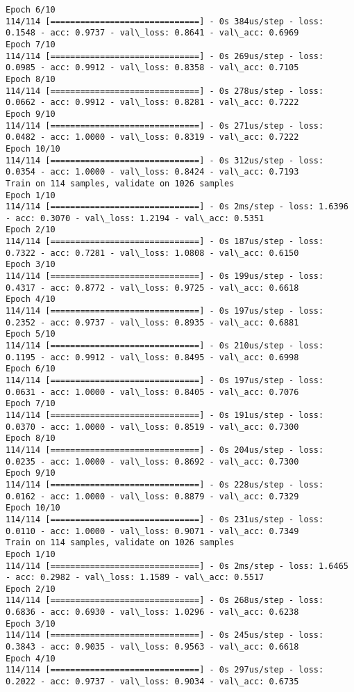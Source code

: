 \documentclass[11pt]{article}
\begin{document}
\begin{Verbatim}[commandchars=\\\{\}]
Epoch 6/10
114/114 [==============================] - 0s 384us/step - loss: 0.1548 - acc: 0.9737 - val\_loss: 0.8641 - val\_acc: 0.6969
Epoch 7/10
114/114 [==============================] - 0s 269us/step - loss: 0.0985 - acc: 0.9912 - val\_loss: 0.8358 - val\_acc: 0.7105
Epoch 8/10
114/114 [==============================] - 0s 278us/step - loss: 0.0662 - acc: 0.9912 - val\_loss: 0.8281 - val\_acc: 0.7222
Epoch 9/10
114/114 [==============================] - 0s 271us/step - loss: 0.0482 - acc: 1.0000 - val\_loss: 0.8319 - val\_acc: 0.7222
Epoch 10/10
114/114 [==============================] - 0s 312us/step - loss: 0.0354 - acc: 1.0000 - val\_loss: 0.8424 - val\_acc: 0.7193
Train on 114 samples, validate on 1026 samples
Epoch 1/10
114/114 [==============================] - 0s 2ms/step - loss: 1.6396 - acc: 0.3070 - val\_loss: 1.2194 - val\_acc: 0.5351
Epoch 2/10
114/114 [==============================] - 0s 187us/step - loss: 0.7322 - acc: 0.7281 - val\_loss: 1.0808 - val\_acc: 0.6150
Epoch 3/10
114/114 [==============================] - 0s 199us/step - loss: 0.4317 - acc: 0.8772 - val\_loss: 0.9725 - val\_acc: 0.6618
Epoch 4/10
114/114 [==============================] - 0s 197us/step - loss: 0.2352 - acc: 0.9737 - val\_loss: 0.8935 - val\_acc: 0.6881
Epoch 5/10
114/114 [==============================] - 0s 210us/step - loss: 0.1195 - acc: 0.9912 - val\_loss: 0.8495 - val\_acc: 0.6998
Epoch 6/10
114/114 [==============================] - 0s 197us/step - loss: 0.0631 - acc: 1.0000 - val\_loss: 0.8405 - val\_acc: 0.7076
Epoch 7/10
114/114 [==============================] - 0s 191us/step - loss: 0.0370 - acc: 1.0000 - val\_loss: 0.8519 - val\_acc: 0.7300
Epoch 8/10
114/114 [==============================] - 0s 204us/step - loss: 0.0235 - acc: 1.0000 - val\_loss: 0.8692 - val\_acc: 0.7300
Epoch 9/10
114/114 [==============================] - 0s 228us/step - loss: 0.0162 - acc: 1.0000 - val\_loss: 0.8879 - val\_acc: 0.7329
Epoch 10/10
114/114 [==============================] - 0s 231us/step - loss: 0.0110 - acc: 1.0000 - val\_loss: 0.9071 - val\_acc: 0.7349
Train on 114 samples, validate on 1026 samples
Epoch 1/10
114/114 [==============================] - 0s 2ms/step - loss: 1.6465 - acc: 0.2982 - val\_loss: 1.1589 - val\_acc: 0.5517
Epoch 2/10
114/114 [==============================] - 0s 268us/step - loss: 0.6836 - acc: 0.6930 - val\_loss: 1.0296 - val\_acc: 0.6238
Epoch 3/10
114/114 [==============================] - 0s 245us/step - loss: 0.3843 - acc: 0.9035 - val\_loss: 0.9563 - val\_acc: 0.6618
Epoch 4/10
114/114 [==============================] - 0s 297us/step - loss: 0.2022 - acc: 0.9737 - val\_loss: 0.9034 - val\_acc: 0.6735

\end{Verbatim}
\end{document}
